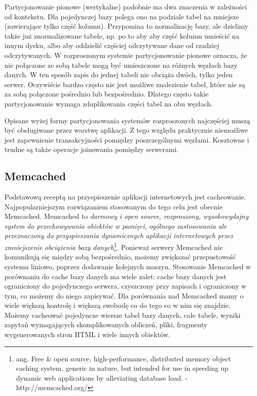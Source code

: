
Partycjonowanie pionowe (wertykalne) podobnie ma dwa znaczenia w zależności od kontekstu.
Dla pojedynczej bazy polega ono na podziale tabel na mniejsze (zawierające tylko część kolumn).
Przypomina to normalizację bazy, ale dzielimy także już znormalizowane tabele, np. po to aby aby część kolumn umieścić na innym dysku, albo aby oddzielić częściej odczytywane dane od rzadziej odczytywanych.
W rozproszonym systemie partycjonowanie pionowe oznacza, że nie połączone ze sobą tabele mogą być umieszczone na różnych węzłach bazy danych.
W ten sposób zapis do jednej tabeli nie obciąża dwóch, tylko jeden serwer.
Oczywiście bardzo często nie jest możliwe znalezienie tabel, które nie są za sobą połączone pośrednio lub bezpośrednio.
Dlatego często takie partycjonowanie wymaga zduplikowania części tabel na obu węzłach.

Opisane wyżej formy partycjonowania systemów rozproszonych najczęściej muszą być obsługiwane przez warstwę aplikacji.
Z tego względu praktycznie niemożliwe jest zapewnienie transakcyjności pomiędzy poszczególnymi węzłami.
Kosztowne i trudne są także operacje joinowania pomiędzy serwerami.

\subsection{Memcached}

Podstawową receptą na przyspieszenie aplikacji internetowych jest cacheowanie.
Najpopularniejszym rozwiązaniem stosowanym do tego celu jest obecnie Memcached.
Memcached to \emph{darmowy i open source, rozproszony, wysokowydajny system do przechowywania obiektów w pamięci, ogólnego zastosowania ale przeznaczony do przyspieszania dynamicznych aplikacji internetowych przez zmniejszenie obciążenia bazy danych}\footnote{ang. Free \& open source, high-performance, distributed memory object caching system, generic in nature, but intended for use in speeding up dynamic web applications by alleviating database load. - http://memcached.org/}.
Ponieważ serwery Memcached nie komunikują się między sobą bezpośrednio, możemy zwiększać przepustowość systemu liniowo, poprzez dodawanie kolejnych maszyn.
Stosowanie Memcached w porównaniu do cache bazy danych ma wiele zalet: cache bazy danych jest ograniczony do pojedynczego serwera, czyszczony przy zapisach i ograniczony w tym, co możemy do niego zapisywać.
Dla porównania nad Memcached mamy o wiele większą kontrolę i większą swobodę co do tego co w nim się znajdzie.
Możemy cacheować pojedyncze wiersze tabel bazy danych, całe tabele, wyniki zapytań wymagających skomplikowanych obliczeń, pliki, fragmenty wygenerowanych stron HTML i wiele innych obiektów.

